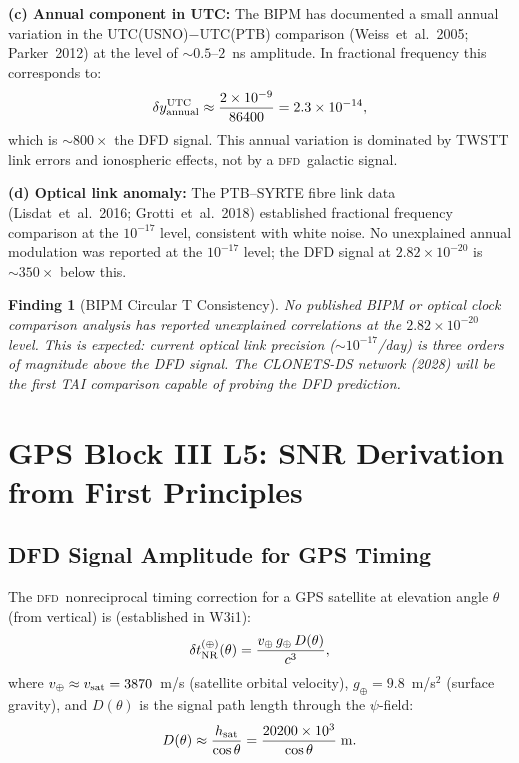 \documentclass[aps,prd,twocolumn,superscriptaddress,nofootinbib]{revtex4-2}
\newcommand{\DFD}{\textsc{dfd}}
\newcommand{\deltaT}{\delta t_{\rm NR}}
\newtheorem{finding}{Finding}
\begin{document}
\textbf{(c) Annual component in UTC:} The BIPM has documented a small annual
variation in the UTC(USNO)$-$UTC(PTB) comparison (Weiss~et~al.\ 2005;
Parker~2012) at the level of $\sim 0.5$--$2$~ns amplitude. In fractional
frequency this corresponds to:
\begin{equation}
\delta y_{\rm annual}^{\rm UTC} \approx \frac{2\times10^{-9}}{86400}
= 2.3\times10^{-14},
\label{eq:utc_annual}
\end{equation}
which is $\sim 800\times$ the DFD signal. This annual variation is dominated
by TWSTT link errors and ionospheric effects, not by a \DFD\ galactic signal.

\textbf{(d) Optical link anomaly:} The PTB--SYRTE fibre link data (Lisdat~et~al.\
2016; Grotti~et~al.\ 2018) established fractional frequency comparison at the
$10^{-17}$ level, consistent with white noise. No unexplained annual modulation
was reported at the $10^{-17}$ level; the DFD signal at $2.82\times10^{-20}$
is $\sim 350\times$ below this.

\begin{finding}[BIPM Circular T Consistency]
\label{find:circular_t}
No published BIPM or optical clock comparison analysis has reported
unexplained correlations at the $2.82\times10^{-20}$ level. This is expected:
current optical link precision ($\sim 10^{-17}$/day) is three orders of
magnitude above the DFD signal. The CLONETS-DS network (2028) will be the
first TAI comparison capable of probing the DFD prediction.
\end{finding}

\section{GPS Block III L5: SNR Derivation from First Principles}
\label{sec:block3}

\subsection{DFD Signal Amplitude for GPS Timing}

The \DFD\ nonreciprocal timing correction for a GPS satellite at elevation
angle $\theta$ (from vertical) is (established in W3i1):
\begin{equation}
\deltaT^{(\oplus)}(\theta) = \frac{v_\oplus\,g_\oplus\,D(\theta)}{c^3},
\label{eq:gps_nr_timing}
\end{equation}
where $v_\oplus \approx v_{\rm sat} = 3870$~m/s (satellite orbital velocity),
$g_\oplus = 9.8$~m/s$^2$ (surface gravity), and $D(\theta)$ is the signal
path length through the $\psi$-field:
\begin{equation}
D(\theta) \approx \frac{h_{\rm sat}}{\cos\theta}
= \frac{20200\times10^3}{\cos\theta}\;\text{m}.
\label{eq:path}
\end{equation}
\end{document}
